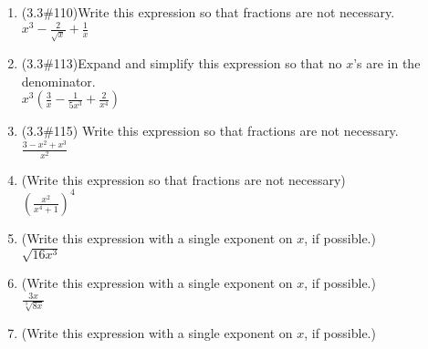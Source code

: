 \documentclass[11pt,fleqn]{article}
\begin{document}
\begin{enumerate}
\begin{enumerate}
\end{enumerate}
\newpage
	\item (3.3\#110)Write this expression so that fractions are not necessary.\\ 
	
	$x^3-\frac{2}{\sqrt{x}}+\frac{1}{x}$\\ \vfill
	\item (3.3\#113)Expand and simplify this expression so that no $x$'s are in the denominator.\\ 
	
	$x^3\left(\frac{3}{x}-\frac{1}{5x^3}+\frac{2}{x^4}\right)$\\ \vfill
	
	\item (3.3\#115) Write this expression so that fractions are not necessary.\\ 
	
	$\frac{3-x^2+x^3}{x^2}$\\ \vfill
	
	\item (Write this expression so that fractions are not necessary) \\$(\frac{x^2}{x^4+1})^4$\\ 
	\vfill
	\item (Write this expression with a single exponent on $x$, if possible.) \\
	
	$\sqrt{16x^3}$\\ 
	\vfill
	\item (Write this expression with a single exponent on $x$, if possible.) \\
	
	$\frac{3x}{\sqrt[3]{8x}}$\\ 
	\vfill
	\item (Write this expression with a single exponent on $x$, if possible.) \\
	

\end{enumerate}
\end{document}
